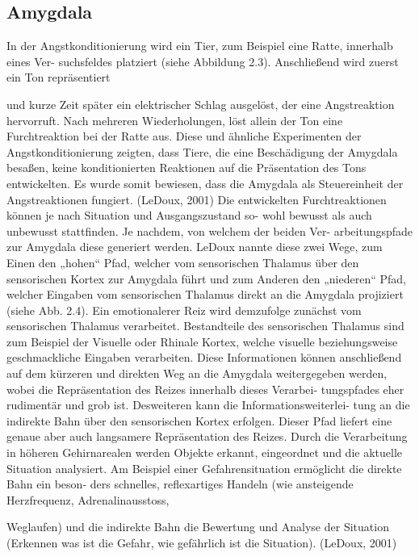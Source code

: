\subsection{ Amygdala}
In der Angstkonditionierung wird ein Tier, zum Beispiel eine Ratte, innerhalb eines Ver-
suchsfeldes platziert (siehe Abbildung 2.3). Anschließend wird zuerst ein Ton repräsentiert 


und kurze Zeit später ein elektrischer Schlag ausgelöst, der eine Angstreaktion
hervorruft. Nach mehreren Wiederholungen, löst allein der Ton eine Furchtreaktion bei
der Ratte aus. Diese und ähnliche Experimenten der Angstkonditionierung zeigten, dass
Tiere, die eine Beschädigung der Amygdala besaßen, keine konditionierten Reaktionen
auf die Präsentation des Tons entwickelten. Es wurde somit bewiesen, dass die Amygdala
als Steuereinheit der Angstreaktionen fungiert. (LeDoux, 2001)
Die entwickelten Furchtreaktionen können je nach Situation und Ausgangszustand so-
wohl bewusst als auch unbewusst stattfinden. Je nachdem, von welchem der beiden Ver-
arbeitungspfade zur Amygdala diese generiert werden. LeDoux nannte diese zwei Wege,
zum Einen den „hohen“ Pfad, welcher vom sensorischen Thalamus über den sensorischen
Kortex zur Amygdala führt und zum Anderen den „niederen“ Pfad, welcher Eingaben
vom sensorischen Thalamus direkt an die Amygdala projiziert (siehe Abb. 2.4). Ein
emotionalerer Reiz wird demzufolge zunächst vom sensorischen Thalamus verarbeitet.
Bestandteile des sensorischen Thalamus sind zum Beispiel der Visuelle oder Rhinale
Kortex, welche visuelle beziehungsweise geschmackliche Eingaben verarbeiten. Diese
Informationen können anschließend auf dem kürzeren und direkten Weg an die Amygdala
weitergegeben werden, wobei die Repräsentation des Reizes innerhalb dieses Verarbei-
tungspfades eher rudimentär und grob ist. Desweiteren kann die Informationsweiterlei-
tung an die indirekte Bahn über den sensorischen Kortex erfolgen. Dieser Pfad liefert
eine genaue aber auch langsamere Repräsentation des Reizes. Durch die Verarbeitung in
höheren Gehirnarealen werden Objekte erkannt, eingeordnet und die aktuelle Situation
analysiert. Am Beispiel einer Gefahrensituation ermöglicht die direkte Bahn ein beson-
ders schnelles, reflexartiges Handeln (wie ansteigende Herzfrequenz, Adrenalinausstoss,


Weglaufen) und die indirekte Bahn die Bewertung und Analyse der Situation (Erkennen
was ist die Gefahr, wie gefährlich ist die Situation). (LeDoux, 2001)

